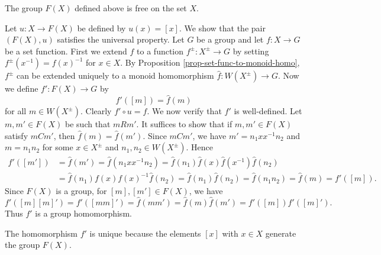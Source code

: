 \begin{proposition}
	The group $F(X)$ defined above is free on the set $X$.
\end{proposition}
\begin{sketch}
	Let $u:X\to F(X)$ be defined by $u(x) = [x]$. We show that the pair $(F(X),u)$ satisfies the universal property. Let $G$ be a group and let $f:X\to G$ be a set function.  First we extend $f$ to a function $f^{\pm}:X^{\pm}\to G$ by setting $f^{\pm}(x^{-1}) = f(x)^{-1}$ for $x\in X$. By Proposition \ref{prop-set-func-to-monoid-homo}, $f^{\pm}$ can be extended uniquely to a monoid homomorphism $\hat{f}:W(X^{\pm})\to G$. Now we define $f':F(X)\to G$ by 
	\begin{equation*}
		f'([m]) = \hat{f}(m)
	\end{equation*}
	for all $m\in W(X^{\pm})$. Clearly $f'\circ u = f$. We now verify that $f'$ is well-defined. Let $m,m'\in F(X)$ be such that $mRm'$.  It suffices to show that if $m,m'\in F(X)$ satisfy $mCm'$, then $\hat{f}(m) = \hat{f}(m')$. Since $mCm'$, we have $m' = n_1 x x^{-1} n_2$ and $m = n_1 n_2$ for some $x \in X^{\pm}$ and $n_1, n_2\in W(X^{\pm})$. Hence
	\begin{align*}
		f'([m']) &= \hat{f}(m')
		= \hat{f}(n_1 x x^{-1} n_2)
		=\hat{f}(n_1 )\hat{f}(x)\hat{f}( x^{-1} )\hat{f}(n_2)
		\\
		&= \hat{f}(n_1 )f(x)f(x)^{-1}\hat{f}(n_2)
		= \hat{f}(n_1 )\hat{f}(n_2)
		= \hat{f}(n_1 n_2)
		= \hat{f}(m)
		= f'([m]).
	\end{align*}
	Since $F(X)$ is a group,  for $[m],[m']\in F(X)$, we have 
	\begin{equation*}
		f'([m][m]') = f'([mm]') = \hat{f}(mm') = \hat{f}(m)\hat{f}(m') = f'([m])f'([m]').
	\end{equation*}
	Thus $f'$ is a group homomorphism.
	
	The homomorphism $f'$ is unique  because the elements $[x]$ with $x \in X$ generate the group $F(X)$. 
\end{sketch}


